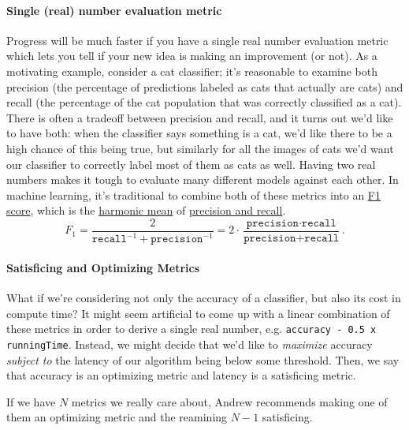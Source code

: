 \documentclass[12pt]{article}
\begin{document}
\paragraph{Single (real) number evaluation metric} Progress will be much faster if you have a single real number evaluation metric which lets you tell if your new idea is making an improvement (or not). As a motivating example, consider
a cat classifier; it's reasonable to examine both precision (the percentage of predictions labeled as cats that actually are cats) and recall (the percentage of the cat population that was correctly classified as a cat). There is often
a tradeoff between precision and recall, and it turns out we'd like to have both: when the classifier says something
is a cat, we'd like there to be a high chance of this being true, but similarly for all the images of cats we'd want
our classifier to correctly label most of them as cats as well. Having
two real numbers makes it tough to evaluate many different models against each other. In machine learning, it's traditional to combine both of these metrics into an \href{https://en.wikipedia.org/wiki/F1_score}{F1 score}, which is the \href{https://en.wikipedia.org/wiki/Harmonic_mean}{harmonic mean} of \href{https://en.wikipedia.org/wiki/Precision_and_recall}{precision and recall}.
\[
F_1 = \frac{2}{\texttt{recall}^{-1} + \texttt{precision}^{-1}} = 2 \cdot \frac{\texttt{precision} \cdot \texttt{recall}}{\texttt{precision} + \texttt{recall}}.
\]
 
\paragraph{Satisficing and Optimizing Metrics} 
What if we're considering not only the accuracy of a classifier, but also its cost in compute time? It might seem artificial to come up with a linear combination of these metrics in order to derive a single real number, e.g. \texttt{accuracy - 0.5 x runningTime}. Instead, we might decide that we'd like to \emph{maximize} accuracy \emph{subject to}
the latency of our algorithm being below some threshold. Then, we say that accuracy is an optimizing metric and
 latency is a satisficing metric.

If we have $N$ metrics we really care about, Andrew recommends making one of them an optimizing metric and
the reamining $N-1$ satisficing.
\end{document}
